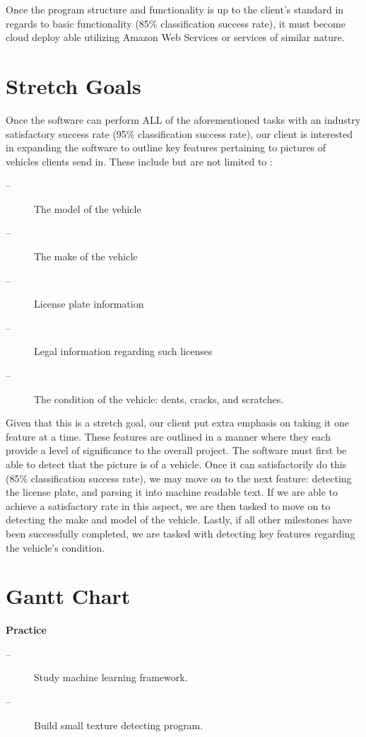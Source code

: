 \documentclass[onecolumn, draftclsnofoot,10pt, compsoc]{IEEEtran}
\begin{document}
Once the program structure and functionality is up to the client's standard in regards to basic functionality (85\% classification success rate), it must become cloud deploy able utilizing Amazon Web Services or services of similar nature. 

\section{Stretch Goals}
	
	Once the software can perform ALL of the aforementioned tasks with an industry satisfactory success rate (95\% classification success rate), our client is interested in expanding the software to outline key features pertaining to pictures of vehicles clients send in. These include but are not limited to :
\begin{description}
	\item[--]The model of the vehicle
	\item[--]The make of the vehicle 
	\item[--]License plate information
	\item[--]Legal information regarding such licenses
	\item[--]The condition of the vehicle: dents, cracks, and scratches.
\end{description}

Given that this is a stretch goal, our client put extra emphasis on taking it one feature at a time. These features are outlined in a manner where they each provide a level of significance to the overall project. The software must first be able to detect that the picture is of a vehicle.  Once it can satisfactorily do this (85\% classification success rate), we may move on to the next feature: detecting the license plate, and parsing it into machine readable text. If we are able to achieve a satisfactory rate in this aspect, we are then tasked to move on to detecting the make and model of the vehicle. Lastly, if all other milestones have been successfully completed, we are tasked with detecting key features regarding the vehicle's condition. 

\section{Gantt Chart}
\textbf{Practice}
\begin{description}
	\item[--]Study machine learning framework.
	\item[--]Build small texture detecting program.
\end{description}
\end{document}
